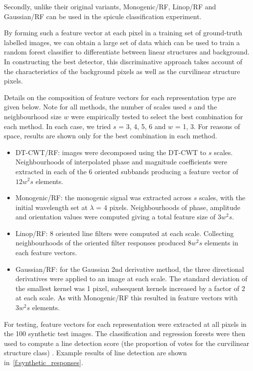 Secondly, unlike their original variants, Monogenic/RF, Linop/RF and Gaussian/RF can be used in the spicule classification experiment.

By forming such a feature vector at each pixel in a training set of ground-truth labelled images, we can obtain a large set of data which can be used to train a random forest classifier to differentiate between linear structures and background. In constructing the best detector, this discriminative approach takes account of the characteristics of the background pixels as well as the curvilinear structure pixels.

Details on the composition of feature vectors for each representation type are given below. Note for all methods, the number of scales used $s$ and the neighbourhood size $w$ were empirically tested to select the best combination for each method. In each case, we tried $s$ = 3, 4, 5, 6 and $w$ = 1, 3. For reasons of space, results are shown only for the best combination in each method.

\begin{itemize}
\item	DT-CWT/RF: images were decomposed using the DT-CWT to $s$ scales. Neighbourhoods of interpolated phase and magnitude coefficients were extracted in each of the 6 oriented subbands producing a feature vector of $12 w^2 s$ elements.
\item	Monogenic/RF: the monogenic signal was extracted across $s$ scales, with the initial wavelength set at $\lambda$ = 4 pixels. Neighbourhoods of phase, amplitude and orientation values were computed giving a total feature size of $3 w^2 s$. 
\item	Linop/RF: 8 oriented line filters were computed at each scale. Collecting neighbourhoods of the oriented filter responses produced $8 w^2 s$ elements in each feature vectors.
\item	Gaussian/RF: for the Gaussian 2nd derivative method, the three directional derivatives were applied to an image at each scale. The standard deviation of the smallest kernel was 1 pixel, subsequent kernels increased by a factor of 2 at each scale. As with Monogenic/RF this resulted in feature vectors with $3 w^2 s$ elements.
\end{itemize}

For testing, feature vectors for each representation were extracted at all pixels in the 100 synthetic test images. The classification and regression forests were then used to compute a line detection score (the proportion of votes for the curvilinear structure class) . Example results of line detection are shown in~\ref{f:synthetic_responses}.


